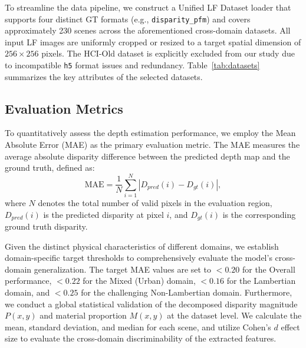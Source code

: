 \documentclass[lettersize,journal]{IEEEtran}
\begin{document}
To streamline the data pipeline, we construct a Unified LF Dataset loader that supports four distinct GT formats (e.g., \texttt{disparity\_pfm}) and covers approximately 230 scenes across the aforementioned cross-domain datasets. All input LF images are uniformly cropped or resized to a target spatial dimension of $256 \times 256$ pixels. The HCI-Old dataset is explicitly excluded from our study due to incompatible \texttt{h5} format issues and redundancy. Table~\ref{tab:datasets} summarizes the key attributes of the selected datasets.

\begin{table}[!t]
\centering
\caption{Summary of Light Field Datasets Used in Experiments}
\label{tab:datasets}
\end{table}

\subsection{Evaluation Metrics}
To quantitatively assess the depth estimation performance, we employ the Mean Absolute Error (MAE) as the primary evaluation metric. The MAE measures the average absolute disparity difference between the predicted depth map and the ground truth, defined as:
\begin{equation}
\text{MAE} = \frac{1}{N} \sum_{i=1}^{N} |D_{pred}(i) - D_{gt}(i)|,
\label{eq:mae}
\end{equation}
where $N$ denotes the total number of valid pixels in the evaluation region, $D_{pred}(i)$ is the predicted disparity at pixel $i$, and $D_{gt}(i)$ is the corresponding ground truth disparity. 

Given the distinct physical characteristics of different domains, we establish domain-specific target thresholds to comprehensively evaluate the model's cross-domain generalization. The target MAE values are set to $< 0.20$ for the Overall performance, $< 0.22$ for the Mixed (Urban) domain, $< 0.16$ for the Lambertian domain, and $< 0.25$ for the challenging Non-Lambertian domain. Furthermore, we conduct a global statistical validation of the decomposed disparity magnitude $P(x,y)$ and material proportion $M(x,y)$ at the dataset level. We calculate the mean, standard deviation, and median for each scene, and utilize Cohen's $d$ effect size to evaluate the cross-domain discriminability of the extracted features.
\end{document}
